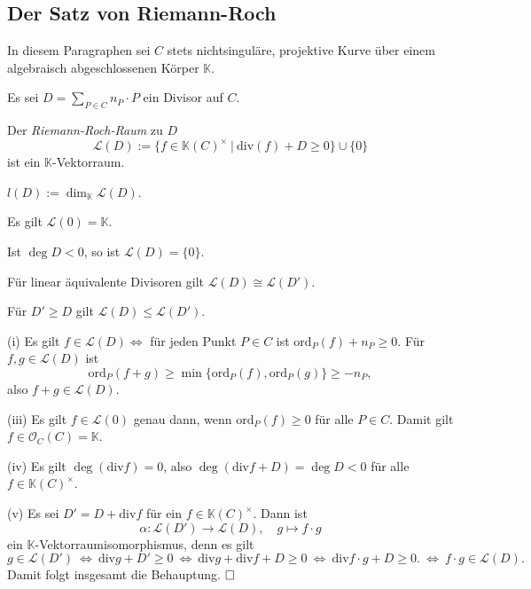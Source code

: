 \documentclass[11pt]{book}
\theoremstyle{nonumberbreak}
\newenvironment{pr}[1][]{\ifthenelse{\equal{#1}{}}{\proof}{\proof[#1]}\rm}{\endproof}
\newenvironment{definbem}[1][]{\ifthenelse{\equal{#1}{}}{\definibem}{\definibem[#1]}\rm}{\enddefinibem}
\begin{document}
\begin{spacing}{1.3}
\section{Der Satz von Riemann-Roch} %
\renewcommand*\thesection{\arabic{section}}

In diesem Paragraphen sei $C$ stets nichtsinguläre, projektive Kurve über einem algebraisch abgeschlossenen Körper $\mathbb{K}$.



\begin{definbem} %

Es sei $D= \sum_{P \in C} n_P \cdot P$ ein Divisor auf $C$.
\begin{compactenum}
\item Der \textit{Riemann-Roch-Raum} zu $D$
$$\mathcal{L}(D) := \{f \in \mathbb{K}(C)^{\times} \ \vert \ \textrm{div}(f) + D \geqslant 0 \} \cup \{0 \}$$
ist ein $\mathbb{K}$-Vektorraum.
\item $l(D):= \dim_{\mathbb{K}} \mathcal{L}(D)$.
\item Es gilt $\mathcal{L}(0)= \mathbb{K}$.
\item Ist $\deg D <0$, so ist $\mathcal{L}(D)= \{0\}$.
\item Für linear äquivalente Divisoren gilt $\mathcal{L}(D) \cong \mathcal{L}(D')$.
\item Für $D' \geqslant D$ gilt $\mathcal{L}(D) \leqslant \mathcal{L}(D')$.
\end{compactenum}
\begin{pr}
\begin{compactenum}
\item[(i)] Es gilt $f \in \mathcal{L}(D) \Longleftrightarrow $ für jeden Punkt $P \in C$ ist $\textrm{ord}_P(f) + n_P \geqslant 0$. Für $f,g \in \mathcal{L}(D)$ ist 
$$\textrm{ord}_P(f+g) \geqslant \min \{ \textrm{ord}_P(f), \textrm{ord}_P(g) \} \geqslant -n_P,$$
also $f+g \in \mathcal{L}(D)$.
\item[(iii)] Es gilt $f \in \mathcal{L}(0)$ genau dann, wenn $\textrm{ord}_P(f) \geqslant 0$ für alle $P \in C$. Damit gilt $f \in \mathcal{O}_C(C)= \mathbb{K}$.
\item[(iv)] Es gilt $\deg ( \textrm{div} f ) =0$, also $\deg ( \textrm{div} f + D) = \deg D < 0$ für alle $f \in \mathbb{K}(C)^{\times}$.
\item[(v)] Es sei $D'  = D + \textrm{div} f$ für ein $f \in \mathbb{K}(C)^{\times}$. Dann ist
$$\alpha: \mathcal{L}(D') \longrightarrow \mathcal{L}(D), \quad g \mapsto f\cdot g$$
ein $\mathbb{K}$-Vektorraumisomorphismus, denn es gilt
$$g \in \mathcal{L}(D') \ \Longleftrightarrow \ \textrm{div} g + D' \geqslant 0 \ \Longleftrightarrow \ \textrm{div}g + \textrm{div}f + D \geqslant 0 \ \Longleftrightarrow \ \textrm{div}f\cdot g + D \geqslant 0.
 \ \Longleftrightarrow \ f\cdot g \in \mathcal{L}(D).$$
 Damit folgt insgesamt die Behauptung. $\hfill \Box$
\end{compactenum}
\end{pr}
\end{definbem}


\end{spacing}
\end{document}
